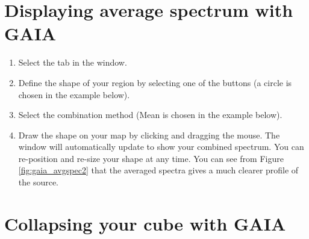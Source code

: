 \documentclass[11pt,oneside,chapters]{starlink}
\begin{document}
\section{Displaying average spectrum with GAIA}

\begin{enumerate}[label=(\textbf{\arabic*})]
\item Select the  tab in the  window.

\item Define the shape of your region by selecting one of the
 buttons (a circle is chosen in the example
below).

\item Select the combination method (Mean is chosen in the example below).



\item Draw the shape on your map by clicking and dragging the mouse.
The  window will automatically update to show
your combined spectrum. You can re-position and re-size your shape at
any time. You can see from Figure \ref{fig:gaia_avgspec2} that the
averaged spectra gives a much clearer profile of the source.

\end{enumerate}

\section{Collapsing your cube with GAIA}
\end{document}

